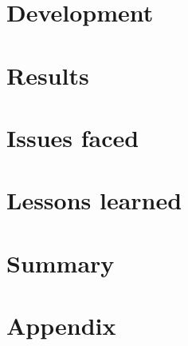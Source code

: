 \documentclass[
pdftex,                %
a4paper,                 %
11pt,                     %
parskip=half,         %
headsepline,        %
]
{scrartcl}
\begin{document}
  

  \pagebreak

  \section{Development}

  

  \pagebreak

  \section{Results}

  

  \section{Issues faced}

  \section{Lessons learned}

  
	
	\section{Summary}
	
	
	
	\renewcommand{\refname}{Literatur}
	\begin{thebibliography}{xxxx}
		
	\end{thebibliography}

  \pagebreak

  \appendix

  \section*{Appendix}

  
	
\end{document}
